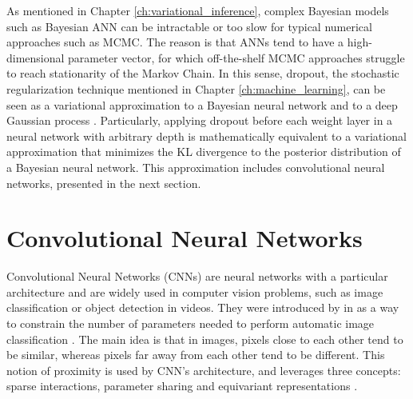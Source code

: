 As mentioned in Chapter \ref{ch:variational_inference}, complex Bayesian models such as Bayesian ANN can be intractable or too slow for typical numerical approaches such as MCMC. The reason is that ANNs tend to have a high-dimensional parameter vector, for which off-the-shelf MCMC approaches struggle to reach stationarity of the Markov Chain. In this sense, dropout, the stochastic regularization technique mentioned in Chapter \ref{ch:machine_learning}, can be seen as a variational approximation to a Bayesian neural network and to a deep Gaussian process \cite{gal2015dropout, gal2015dropout1, gal2015bayesian, gal2015modern}. Particularly, applying dropout before each weight layer in a neural network with arbitrary depth is mathematically equivalent to a variational approximation that minimizes the KL divergence to the posterior distribution of a Bayesian neural network. This approximation includes convolutional neural networks, presented in the next section.




\section{Convolutional Neural Networks}

Convolutional Neural Networks (CNNs) are neural networks with a particular architecture and are widely used in computer vision problems, such as image classification or object detection in videos. They were introduced by \citeauthor{lecun1989generalization} in \citeyear{lecun1989generalization} as a way to constrain the number of parameters needed to perform automatic image classification \cite{lecun1989generalization}. The main idea is that in images, pixels close to each other tend to be similar, whereas pixels far away from each other tend to be different. This notion of proximity is used by CNN's architecture, and leverages three concepts: sparse interactions, parameter sharing and equivariant representations \cite[p.~335]{bengio2015deep}.


